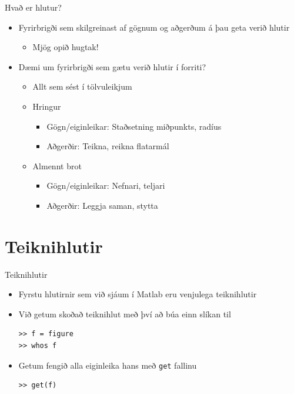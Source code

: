 \documentclass[handout]{beamer}
\begin{document}
\begin{frame}{Hvað er hlutur?}
\pause
\begin{itemize}
 \item Fyrirbrigði sem skilgreinast af gögnum og aðgerðum á þau geta verið hlutir
 \begin{itemize}
  \item Mjög opið hugtak! \pause
 \end{itemize}
 \item Dæmi um fyrirbrigði sem gætu verið hlutir í forriti? \pause
 \begin{itemize}
  \item Allt sem sést í tölvuleikjum
  \item Hringur
  \begin{itemize}
   \item Gögn/eiginleikar: Staðsetning miðpunkts, radíus
   \item Aðgerðir: Teikna, reikna flatarmál
  \end{itemize} 
  \item Almennt brot
  \begin{itemize}
   \item Gögn/eiginleikar: Nefnari, teljari
   \item Aðgerðir: Leggja saman, stytta
  \end{itemize}
 \end{itemize}
\end{itemize}
\end{frame}

\section{Teiknihlutir}

\begin{frame}[fragile]{Teiknihlutir}
\begin{itemize}
 \item Fyrstu hlutirnir sem við sjáum í Matlab eru venjulega teiknihlutir
 \item Við getum skoðað teiknihlut með því að búa einn slíkan til
\begin{verbatim}
>> f = figure
>> whos f
\end{verbatim}
 \item Getum fengið alla eiginleika hans með \texttt{get} fallinu
\begin{verbatim}
>> get(f)
\end{verbatim}
\end{itemize}
\end{frame}
\end{document}
